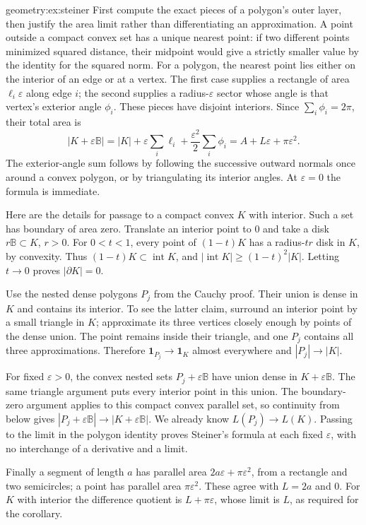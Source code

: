 \begin{solution}{geometry:ex:steiner}
\idea First compute the exact pieces of a polygon's outer layer, then justify the area limit rather than differentiating an approximation.
\writeup A point outside a compact convex set has a unique nearest point: if two different points minimized squared distance, their midpoint would give a strictly smaller value by the identity for the squared norm. For a polygon, the nearest point lies either on the interior of an edge or at a vertex. The first case supplies a rectangle of area $\ell_i\varepsilon$ along edge $i$; the second supplies a radius-$\varepsilon$ sector whose angle is that vertex's exterior angle $\phi_i$. These pieces have disjoint interiors. Since $\sum_i\phi_i=2\pi$, their total area is
\[
|K+\varepsilon\mathbb B|=|K|+\varepsilon\sum_i\ell_i
+\frac{\varepsilon^2}{2}\sum_i\phi_i
=A+L\varepsilon+\pi\varepsilon^2.
\]
The exterior-angle sum follows by following the successive outward normals once around a convex polygon, or by triangulating its interior angles. At $\varepsilon=0$ the formula is immediate.

Here are the details for passage to a compact convex $K$ with interior. Such a set has boundary of area zero. Translate an interior point to $0$ and take a disk $r\mathbb B\subset K$, $r>0$. For $0<t<1$, every point of $(1-t)K$ has a radius-$tr$ disk in $K$, by convexity. Thus $(1-t)K\subset\operatorname{int}K$, and
$|\operatorname{int}K|\ge(1-t)^2|K|$. Letting $t\to0$ proves $|\partial K|=0$.

Use the nested dense polygons $P_j$ from the Cauchy proof. Their union is dense in $K$ and contains its interior. To see the latter claim, surround an interior point by a small triangle in $K$; approximate its three vertices closely enough by points of the dense union. The point remains inside their triangle, and one $P_j$ contains all three approximations. Therefore $\mathbf1_{P_j}\to\mathbf1_K$ almost everywhere and $|P_j|\to|K|$.

For fixed $\varepsilon>0$, the convex nested sets $P_j+\varepsilon\mathbb B$ have union dense in $K+\varepsilon\mathbb B$. The same triangle argument puts every interior point in this union. The boundary-zero argument applies to this compact convex parallel set, so continuity from below gives
$|P_j+\varepsilon\mathbb B|\to|K+\varepsilon\mathbb B|$. We already know $L(P_j)\to L(K)$. Passing to the limit in the polygon identity proves Steiner's formula at each fixed $\varepsilon$, with no interchange of a derivative and a limit.

Finally a segment of length $a$ has parallel area $2a\varepsilon+\pi\varepsilon^2$, from a rectangle and two semicircles; a point has parallel area $\pi\varepsilon^2$. These agree with $L=2a$ and $0$. For $K$ with interior the difference quotient is $L+\pi\varepsilon$, whose limit is $L$, as required for the corollary.
\end{solution}

